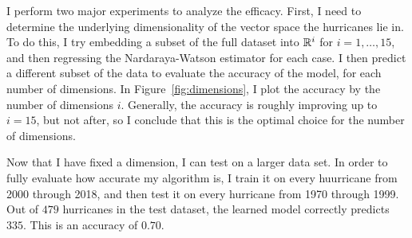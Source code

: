 
\par
I perform two major experiments to analyze the efficacy.
First, I need to determine the underlying dimensionality of the vector space the hurricanes lie in.
To do this, I try embedding a subset of the full dataset into $\mathbb{R}^{i}$ for $i=1,\ldots,15$, and then regressing the Nardaraya-Watson estimator for each case.
I then predict a different subset of the data to evaluate the accuracy of the model, for each number of dimensions.
In Figure~\ref{fig:dimensions}, I plot the accuracy by the number of dimensions $i$.
Generally, the accuracy is roughly improving up to $i=15$, but not after, so I conclude that this is the optimal choice for the number of dimensions.

\par
Now that I have fixed a dimension, I can test on a larger data set.
In order to fully evaluate how accurate my algorithm is, I train it on every huurricane from 2000 through 2018, and then test it on every hurricane from 1970 through 1999.
Out of $479$ hurricanes in the test dataset, the learned model correctly predicts $335$.
This is an accuracy of $0.70$.